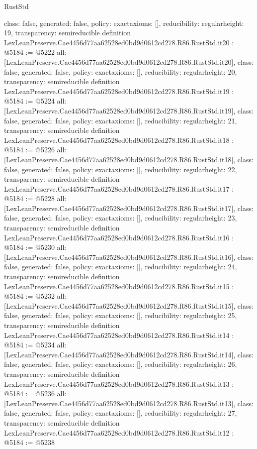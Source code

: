 \begin{lexlean}{RustStd}
\begin{coremodule}
{  class: false,
  generated: false,
  policy: exact{axioms: []},
  reducibility: regular{height: 19},
  transparency: semireducible
}
definition LexLeanPreserve.Cae4456d77aa62528ed0bd9d0612cd278.R86.RustStd.it20 : @5184 := @5222 {
  all: [LexLeanPreserve.Cae4456d77aa62528ed0bd9d0612cd278.R86.RustStd.it20],
  class: false,
  generated: false,
  policy: exact{axioms: []},
  reducibility: regular{height: 20},
  transparency: semireducible
}
definition LexLeanPreserve.Cae4456d77aa62528ed0bd9d0612cd278.R86.RustStd.it19 : @5184 := @5224 {
  all: [LexLeanPreserve.Cae4456d77aa62528ed0bd9d0612cd278.R86.RustStd.it19],
  class: false,
  generated: false,
  policy: exact{axioms: []},
  reducibility: regular{height: 21},
  transparency: semireducible
}
definition LexLeanPreserve.Cae4456d77aa62528ed0bd9d0612cd278.R86.RustStd.it18 : @5184 := @5226 {
  all: [LexLeanPreserve.Cae4456d77aa62528ed0bd9d0612cd278.R86.RustStd.it18],
  class: false,
  generated: false,
  policy: exact{axioms: []},
  reducibility: regular{height: 22},
  transparency: semireducible
}
definition LexLeanPreserve.Cae4456d77aa62528ed0bd9d0612cd278.R86.RustStd.it17 : @5184 := @5228 {
  all: [LexLeanPreserve.Cae4456d77aa62528ed0bd9d0612cd278.R86.RustStd.it17],
  class: false,
  generated: false,
  policy: exact{axioms: []},
  reducibility: regular{height: 23},
  transparency: semireducible
}
definition LexLeanPreserve.Cae4456d77aa62528ed0bd9d0612cd278.R86.RustStd.it16 : @5184 := @5230 {
  all: [LexLeanPreserve.Cae4456d77aa62528ed0bd9d0612cd278.R86.RustStd.it16],
  class: false,
  generated: false,
  policy: exact{axioms: []},
  reducibility: regular{height: 24},
  transparency: semireducible
}
definition LexLeanPreserve.Cae4456d77aa62528ed0bd9d0612cd278.R86.RustStd.it15 : @5184 := @5232 {
  all: [LexLeanPreserve.Cae4456d77aa62528ed0bd9d0612cd278.R86.RustStd.it15],
  class: false,
  generated: false,
  policy: exact{axioms: []},
  reducibility: regular{height: 25},
  transparency: semireducible
}
definition LexLeanPreserve.Cae4456d77aa62528ed0bd9d0612cd278.R86.RustStd.it14 : @5184 := @5234 {
  all: [LexLeanPreserve.Cae4456d77aa62528ed0bd9d0612cd278.R86.RustStd.it14],
  class: false,
  generated: false,
  policy: exact{axioms: []},
  reducibility: regular{height: 26},
  transparency: semireducible
}
definition LexLeanPreserve.Cae4456d77aa62528ed0bd9d0612cd278.R86.RustStd.it13 : @5184 := @5236 {
  all: [LexLeanPreserve.Cae4456d77aa62528ed0bd9d0612cd278.R86.RustStd.it13],
  class: false,
  generated: false,
  policy: exact{axioms: []},
  reducibility: regular{height: 27},
  transparency: semireducible
}
definition LexLeanPreserve.Cae4456d77aa62528ed0bd9d0612cd278.R86.RustStd.it12 : @5184 := @5238 {
}
\end{coremodule}
\end{lexlean}

